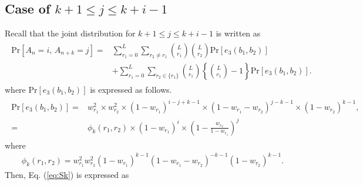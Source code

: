 \subsection{Case of $k+1 \leq j \leq k+i-1$}
Recall that the joint distribution for $k+1 \leq j \leq k+i-1$ is written as
\begin{align}\begin{split}
	\mathrm{Pr}[A_n=i,\, A_{n+k}=j] 
	=& \sum_{r_1=0}^{L} \sum_{r_2 \neq r_1} \binom{L}{r_1}\binom{L}{r_2}\mathrm{Pr}[e_3(b_1,b_2)] \\
	&+ \sum_{r_1=0}^{L} \sum_{r_2 \in \{r_1\}} \binom{L}{r_1}\left\{\binom{L}{r_1}-1\right\}\mathrm{Pr}[e_3(b_1,b_2)].
\end{split}\end{align}
where $\mathrm{Pr}[e_3(b_1,b_2)]$ is expressed as follows.
\begin{align}\begin{split}
	\mathrm{Pr}[e_3(b_1,b_2)]
 	=& w_{r_1}^2  \times w_{r_2}^2 
  \times (1-w_{r_1})^{i-j+k-1} 
  \times (1-w_{r_1}-w_{r_2})^{j-k-1}
  \times (1-w_{r_2})^{k-1}, \\
  =&\phi_k(r_1,r_2)\times (1-w_{r_1})^{i} \times \left(1-\frac{w_{r_2}}{1-w_{r_1}} \right)^{j}
\end{split}\end{align}
%
where
\begin{align}\label{eq:phi_k}
	\phi_k(r_1,r_2) = w_{r_1}^2 w_{r_2}^2 
  	(1-w_{r_1})^{k-1} 
  	(1-w_{r_1}-w_{r_2})^{-k-1}
  	(1-w_{r_2})^{k-1}.
\end{align}
%
Then, Eq. (\ref{eq:Sk}) is expressed as
